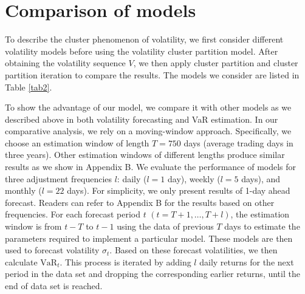 \documentclass[preprint,12pt,authoryear]{elsarticle}
\begin{document}
\section{Comparison of models}
To describe the cluster phenomenon of volatility,
we first consider different volatility models before
using the volatility cluster partition model. After obtaining the
volatility sequence $V$, we then apply cluster partition and cluster
partition iteration to compare the results. The models we consider are listed in Table \ref{tab2}.

To show the advantage of our model, we compare it with other models as we described above in both volatility forecasting and VaR estimation.
In our comparative analysis, we rely on a moving-window approach. Specifically, we choose an estimation window of length $T=750$ days (average trading days in three years). Other estimation windows of different lengths produce similar results as we show in Appendix B.
We evaluate the performance of models for three adjustment frequencies $l$: daily ($l=1$ day), weekly ($l=5$ days), and monthly ($l=22$ days). For simplicity, we only present results of 1-day ahead forecast. Readers can refer to Appendix B for the results based on other frequencies.
For each forecast period $t$ $(t=T+1,\dots,T+l)$,
the estimation window is from $t-T$ to $t-1$
using the data of previous $T$ days to estimate the parameters required to implement a particular model.
These models are then used to forecast volatility $\sigma_t$.
Based on these forecast volatilities, we then calculate $\mathrm{VaR}_t$.
This process is iterated by adding $l$ daily returns for the next period in the data set and dropping the corresponding earlier returns, until the end of data set is reached.
\end{document}

